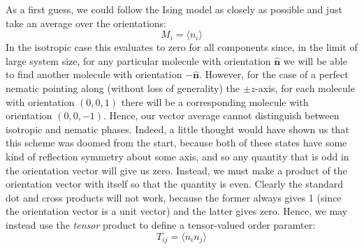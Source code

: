 \documentclass[reqno]{article}
\begin{document}
  As a first guess, we could follow the Ising model as closely as
  possible and just take an average over the orientations:
  \begin{equation*}
    M_i = \langle n_i \rangle
  \end{equation*}
	In the isotropic case this evaluates to zero for all components since, in the
  limit of large system size, for any particular molecule with orientation $\hat{\mathbf{n}}$ we
  will be able to find another molecule with orientation $-\hat{\mathbf{n}}$.
  However, for the case of a perfect nematic pointing along (without loss of
  generality) the $\pm z$-axis, for each molecule with orientation $(0, 0, 1)$
  there will be a corresponding molecule with orientation $(0, 0, -1)$.
  Hence, our vector average cannot distinguish between isotropic and nematic
  phases.
  Indeed, a little thought would have shown us that this scheme was doomed from
  the start, because both of these states have some kind of reflection symmetry
  about some axis, and so any quantity that is odd in the orientation vector
  will give us zero.
  Instead, we must make a product of the orientation vector with itself so that
  the quantity is even.
  Clearly the standard dot and cross products will not work, because the former
  always gives 1 (since the orientation vector is a unit vector) and the latter
  gives zero.
  Hence, we may instead use the \textit{tensor} product to define a tensor-valued
  order paramter:
  \begin{equation}
    T_{ij} = \langle n_i n_j \rangle
  \end{equation}
  
\end{document}
